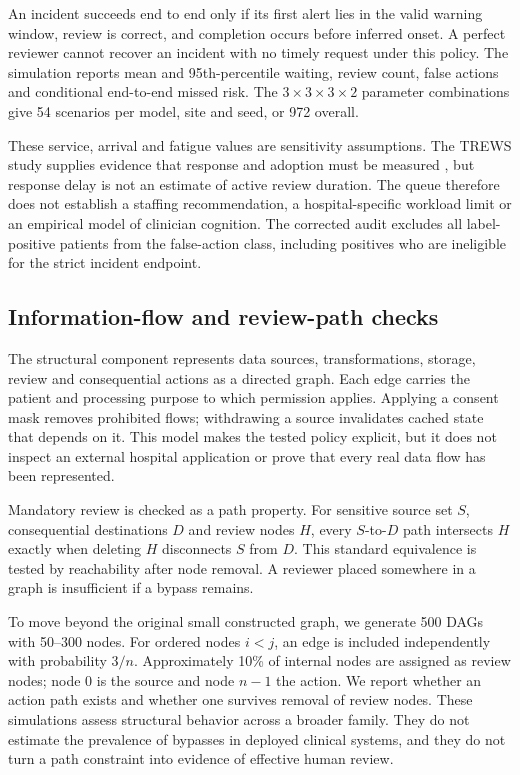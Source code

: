 An incident succeeds end to end only if its first alert lies in the valid warning window, review is correct, and completion occurs before inferred onset. A perfect reviewer cannot recover an incident with no timely request under this policy. The simulation reports mean and 95th-percentile waiting, review count, false actions and conditional end-to-end missed risk. The $3\times3\times3\times2$ parameter combinations give 54 scenarios per model, site and seed, or 972 overall.

These service, arrival and fatigue values are sensitivity assumptions. The TREWS study supplies evidence that response and adoption must be measured \citep{trews}, but response delay is not an estimate of active review duration. The queue therefore does not establish a staffing recommendation, a hospital-specific workload limit or an empirical model of clinician cognition. The corrected audit excludes all label-positive patients from the false-action class, including positives who are ineligible for the strict incident endpoint.

\subsection{Information-flow and review-path checks}
The structural component represents data sources, transformations, storage, review and consequential actions as a directed graph. Each edge carries the patient and processing purpose to which permission applies. Applying a consent mask removes prohibited flows; withdrawing a source invalidates cached state that depends on it. This model makes the tested policy explicit, but it does not inspect an external hospital application or prove that every real data flow has been represented.

Mandatory review is checked as a path property. For sensitive source set $S$, consequential destinations $D$ and review nodes $H$, every $S$-to-$D$ path intersects $H$ exactly when deleting $H$ disconnects $S$ from $D$. This standard equivalence is tested by reachability after node removal. A reviewer placed somewhere in a graph is insufficient if a bypass remains.

To move beyond the original small constructed graph, we generate 500 DAGs with 50--300 nodes. For ordered nodes $i<j$, an edge is included independently with probability $3/n$. Approximately 10\% of internal nodes are assigned as review nodes; node 0 is the source and node $n-1$ the action. We report whether an action path exists and whether one survives removal of review nodes. These simulations assess structural behavior across a broader family. They do not estimate the prevalence of bypasses in deployed clinical systems, and they do not turn a path constraint into evidence of effective human review.
